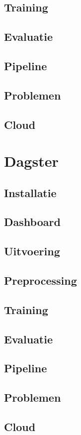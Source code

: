 \subsection{Training}
\subsection{Evaluatie}
\subsection{Pipeline}
\subsection{Problemen}
\subsection{Cloud}

\section{Dagster}
\subsection{Installatie}
\subsection{Dashboard}
\subsection{Uitvoering}
\subsection{Preprocessing}
\subsection{Training}
\subsection{Evaluatie}
\subsection{Pipeline}
\subsection{Problemen}
\subsection{Cloud}


